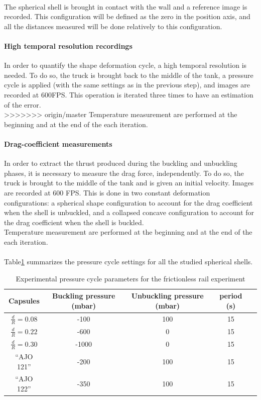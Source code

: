 \paragraph{}
The spherical shell is brought in contact with the wall and a reference image is recorded. This configuration will be defined as the zero in the position axis, and all the distances measured will be done relatively to this configuration.
\paragraph{High temporal resolution recordings}
In order to quantify the shape deformation cycle, a high temporal resolution is needed. To do so, the truck is brought back to the middle of the tank, a pressure cycle is applied (with the same settings as in the previous step), and images are recorded at 600FPS. This operation is iterated three times to have an estimation of the error. \\
>>>>>>> origin/master
Temperature measurement are performed at the beginning and at the end of the each iteration.
\paragraph{Drag-coefficient measurements}
In order to extract the thrust produced during the buckling and unbuckling phases, it is necessary to measure the drag force, independently. To do so, the truck is brought to the middle of the tank and is given an initial velocity. Images are recorded at 600 FPS. This is done in two constant deformation configurations: a spherical shape configuration to account for the drag coefficient when the shell is unbuckled, and a collapsed concave configuration to account for the drag coefficient when the shell is buckled.\\
Temperature measurement are performed at the beginning and at the end of the each iteration.
\paragraph{}
Table\ref{tab:pressure_cycle_configuration} summarizes the pressure cycle settings for all the studied spherical shells.
\begin{table}[H]
	\centering
		\begin{adjustbox}{width=\textwidth}
			\begin{tabular}{|c|c|c|c|c|}
				\hline
				Capsules & Buckling pressure (mbar) & Unbuckling pressure (mbar)&period (s)\\
				\hline
				$\frac{d}{R} = 0.08 $ & -100& 100 & 15\\
				$\frac{d}{R} = 0.22 $ & -600& 0 & 15\\
				$\frac{d}{R} = 0.30 $ & -1000 &  0 & 15\\
				\hline
				"`AJO 121"'& -200 & 100 & 15\\
				"`AJO 122"'& -350 & 100 & 15\\
				\hline
			\end{tabular}
		\end{adjustbox}
	\caption{Experimental pressure cycle parameters for the frictionless rail experiment}
	\label{tab:pressure_cycle_configuration}
\end{table}

